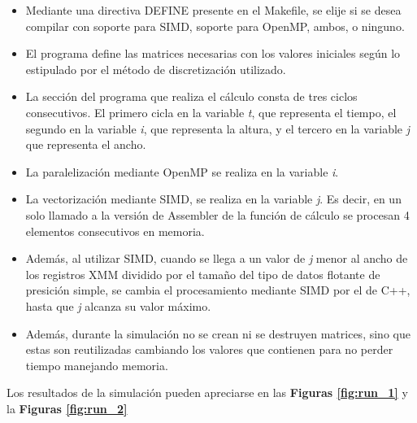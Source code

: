 \begin{itemize}
	\item Mediante una directiva DEFINE presente en el Makefile, se elije si se desea compilar con soporte para SIMD, soporte para OpenMP, ambos, o ninguno.

	\item El programa define las matrices necesarias con los valores iniciales según lo estipulado por el método de discretización utilizado.

	\item La sección del programa que realiza el cálculo consta de tres ciclos consecutivos. El primero cicla en la variable \textit{t}, que representa el tiempo, el segundo en la variable \textit{i}, que representa la altura, y el tercero en la variable \textit{j} que representa el ancho.
	
    \item La paralelización mediante OpenMP se realiza en la variable \textit{i}.
	
    \item La vectorización mediante SIMD, se realiza en la variable \textit{j}. Es decir, en un solo llamado a la versión de Assembler de la función de cálculo se procesan 4 elementos consecutivos en memoria.

    \item Además, al utilizar SIMD, cuando se llega a un valor de \textit{j} menor al ancho de los registros XMM dividido por el tamaño del tipo de datos flotante de presición simple, se cambia el procesamiento mediante SIMD por el de C++, hasta que \textit{j} alcanza su valor máximo.

	\item Además, durante la simulación no se crean ni se destruyen matrices, sino que estas son reutilizadas cambiando los valores que contienen para no perder tiempo manejando memoria.
\end{itemize}

Los resultados de la simulación pueden apreciarse en las \textbf{Figuras \ref{fig:run_1}} y la \textbf{Figuras \ref{fig:run_2}}

